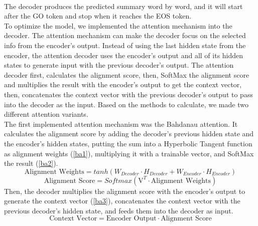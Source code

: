 \documentclass[conference]{IEEEtran}
\begin{document}
\\The decoder produces the predicted summary word by word, and it will start after the GO token and stop when it reaches the EOS token. \\
\indent To optimize the model, we implemented the attention mechanism into the decoder. The attention mechanism can make the decoder focus on the selected info from the encoder’s output. Instead of using the last hidden state from the encoder, the attention decoder uses the encoder’s output and all of its hidden states to generate input with the previous decoder’s output. The attention decoder first, calculates the alignment score, then, SoftMax the alignment score and multiplies the result with the encoder’s output to get the context vector, then, concatenates the context vector with the previous decoder’s output to pass into the decoder as the input. Based on the methods to calculate, we made two different attention variants. \\
\indent The first implemented attention mechanism was the Bahdanau attention. It calculates the alignment score by adding the decoder’s previous hidden state and the encoder’s hidden states, putting the sum into a Hyperbolic Tangent function as alignment weights (\ref{ba1}), multiplying it with a trainable vector, and SoftMax the result (\ref{ba2}).
\begin{dmath}
    \label{ba1}
    \text{Alignment Weights} = tanh(W_{Decoder} \cdot H_{Decoder} + W_{Encoder} \cdot H_{Encoder})
\end{dmath}  
\begin{equation}
    \label{ba2}
\text{Alignment Score} = Softmax(\mathrm{V}_{}^{T} \cdot \text{Alignment Weights})
\end{equation}  
 Then, the decoder multiplies the alignment score with the encoder’s output to generate the context vector (\ref{ba3}), concatenates the context vector with the previous decoder’s hidden state, and feeds them into the decoder as input.
\begin{dmath}
    \label{ba3}
\text{Context Vector} = \text{Encoder Output} \cdot \text{Alignment Score}
\end{dmath}  
\end{document}
